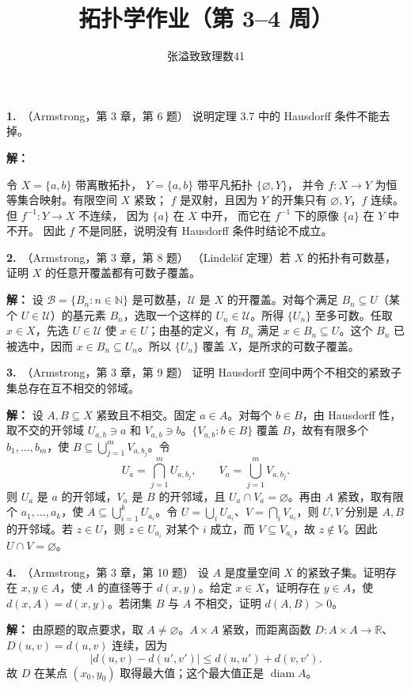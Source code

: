 \documentclass{article}
\title{拓扑学作业（第 3--4 周）}
\author{张溢致\quad 致理数41\quad 2024011936}
\date{}
\newcommand{\R}{\mathbb R}
\newcommand{\problem}[2]{\par\medskip\noindent\textbf{#1.}\ （#2）\quad}
\begin{document}
\maketitle

\problem{1}{Armstrong，第 3 章，第 6 题}
说明定理 3.7 中的 Hausdorff 条件不能去掉。
\par\noindent\textbf{解：}

令 $X=\{a,b\}$ 带离散拓扑，
$Y=\{a,b\}$ 带平凡拓扑 $\{\varnothing,Y\}$，
并令 $f:X\to Y$ 为恒等集合映射。有限空间 $X$ 紧致；
$f$ 是双射，且因为 $Y$ 的开集只有 $\varnothing,Y$，$f$ 连续。
但 $f^{-1}:Y\to X$ 不连续，
因为 $\{a\}$ 在 $X$ 中开，
而它在 $f^{-1}$ 下的原像 $\{a\}$ 在 $Y$ 中不开。
因此 $f$ 不是同胚，说明没有 Hausdorff 条件时结论不成立。


\problem{2}{Armstrong，第 3 章，第 8 题}
（Lindelöf 定理）若 $X$ 的拓扑有可数基，证明 $X$ 的任意开覆盖都有可数子覆盖。
\par\noindent\textbf{解：}
设 $\mathcal B=\{B_n:n\in\mathbb N\}$ 是可数基，$\mathcal U$ 是 $X$ 的开覆盖。对每个满足 $B_n\subseteq U$（某个 $U\in\mathcal U$）的基元素 $B_n$，选取一个这样的 $U_n\in\mathcal U$。所得 $\{U_n\}$ 至多可数。任取 $x\in X$，先选 $U\in\mathcal U$ 使 $x\in U$；由基的定义，有 $B_n$ 满足 $x\in B_n\subseteq U$。这个 $B_n$ 已被选中，因而 $x\in B_n\subseteq U_n$。所以 $\{U_n\}$ 覆盖 $X$，是所求的可数子覆盖。

\problem{3}{Armstrong，第 3 章，第 9 题}
证明 Hausdorff 空间中两个不相交的紧致子集总存在互不相交的邻域。
\par\noindent\textbf{解：}
设 $A,B\subseteq X$ 紧致且不相交。固定 $a\in A$。对每个 $b\in B$，由 Hausdorff 性，取不交的开邻域 $U_{a,b}\ni a$ 和 $V_{a,b}\ni b$。$\{V_{a,b}:b\in B\}$ 覆盖 $B$，故有有限多个 $b_1,\ldots,b_m$，使 $B\subseteq\bigcup_{j=1}^mV_{a,b_j}$。令
\[
U_a=\bigcap_{j=1}^mU_{a,b_j},\qquad V_a=\bigcup_{j=1}^mV_{a,b_j}.
\]
则 $U_a$ 是 $a$ 的开邻域，$V_a$ 是 $B$ 的开邻域，且 $U_a\cap V_a=\varnothing$。再由 $A$ 紧致，取有限个 $a_1,\ldots,a_k$，使 $A\subseteq\bigcup_{i=1}^kU_{a_i}$。令 $U=\bigcup_iU_{a_i}$、$V=\bigcap_iV_{a_i}$，则 $U,V$ 分别是 $A,B$ 的开邻域。若 $z\in U$，则 $z\in U_{a_i}$ 对某个 $i$ 成立，而 $V\subseteq V_{a_i}$，故 $z\notin V$。因此 $U\cap V=\varnothing$。

\problem{4}{Armstrong，第 3 章，第 10 题}
设 $A$ 是度量空间 $X$ 的紧致子集。证明存在 $x,y\in A$，使 $A$ 的直径等于 $d(x,y)$。给定 $x\in X$，证明存在 $y\in A$，使 $d(x,A)=d(x,y)$。若闭集 $B$ 与 $A$ 不相交，证明 $d(A,B)>0$。
\par\noindent\textbf{解：}
由原题的取点要求，取 $A\ne\varnothing$。$A\times A$ 紧致，而距离函数 $D:A\times A\to\R$、$D(u,v)=d(u,v)$ 连续，因为
\[
|d(u,v)-d(u',v')|\le d(u,u')+d(v,v').
\]
故 $D$ 在某点 $(x_0,y_0)$ 取得最大值；这个最大值正是 $\operatorname{diam}A$。
\end{document}
